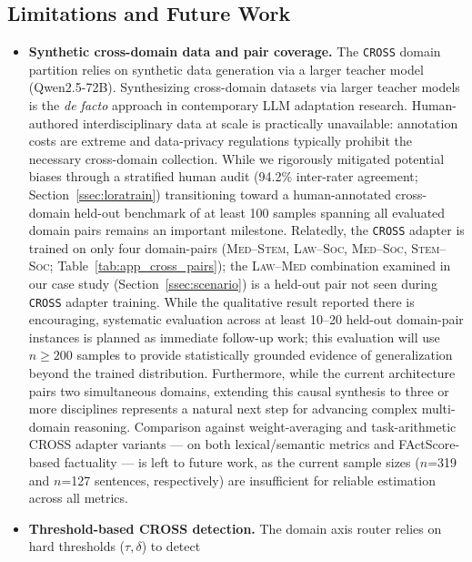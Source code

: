 \documentclass[a4paper,fleql]{cas-sc}
\begin{document}
\subsection{Limitations and Future Work}
\label{sec:limitations}
\begin{itemize}
\item \textbf{Synthetic cross-domain data and pair coverage.}
The \texttt{CROSS} domain partition relies on synthetic data generation via a
larger teacher model (Qwen2.5-72B). Synthesizing cross-domain datasets via larger teacher models is the
\emph{de facto} approach in contemporary LLM adaptation research.
Human-authored interdisciplinary data at scale is practically unavailable:
annotation costs are extreme and data-privacy regulations typically prohibit
the necessary cross-domain collection. While we rigorously mitigated potential biases through
a stratified human audit (94.2\% inter-rater agreement;
Section~\ref{ssec:loratrain}) transitioning toward a human-annotated cross-domain held-out benchmark
of at least 100 samples spanning all evaluated domain pairs remains an
important milestone. Relatedly, the \texttt{CROSS} adapter is trained on only four
domain-pairs (\textsc{Med}--\textsc{Stem}, \textsc{Law}--\textsc{Soc},
\textsc{Med}--\textsc{Soc}, \textsc{Stem}--\textsc{Soc};
Table~\ref{tab:app_cross_pairs}); the \textsc{Law}--\textsc{Med} combination
examined in our case study (Section~\ref{ssec:scenario}) is a held-out pair
not seen during \texttt{CROSS} adapter training. While the qualitative result reported there is encouraging, systematic
evaluation across at least 10--20 held-out domain-pair instances is planned
as immediate follow-up work; this evaluation will use $n{\geq}200$ samples to provide statistically grounded
evidence of generalization beyond the trained distribution. Furthermore, while the current architecture pairs
two simultaneous domains, extending this causal synthesis to three or more
disciplines represents a natural next step for advancing complex
multi-domain reasoning.
Comparison against weight-averaging and task-arithmetic CROSS adapter variants --- on both lexical/semantic metrics and FActScore-based factuality --- is left to future work, as the current sample sizes ($n$=319 and $n$=127 sentences, respectively) are insufficient for reliable estimation across all metrics.
\item \textbf{Threshold-based CROSS detection.} The domain axis router relies on hard thresholds ($\tau, \delta$) to detect

\end{itemize}
\end{document}
